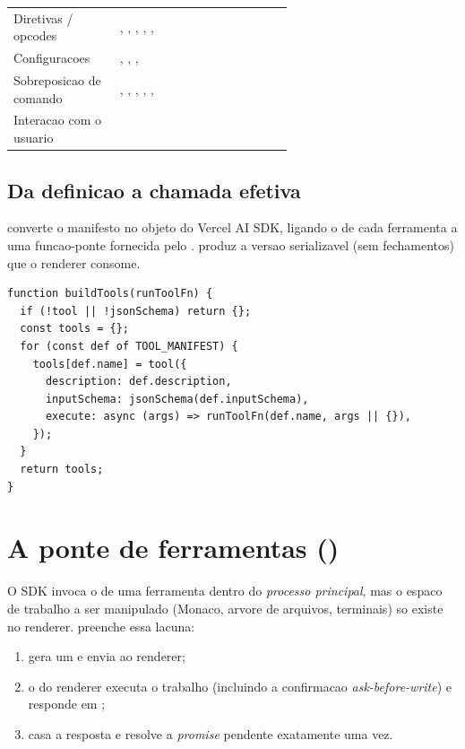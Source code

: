 \begin{longtable}{l P{0.62\linewidth}}
Diretivas / opcodes    & , , , , ,  \\
Configuracoes          & , , ,  \\
Sobreposicao de comando& , , , , ,  \\
Interacao com o usuario&  \\
\end{longtable}

\subsection{Da definicao a chamada efetiva}

 converte o manifesto no objeto  do
Vercel AI SDK, ligando o  de cada ferramenta a uma funcao-ponte
fornecida pelo .  produz a versao serializavel
(sem fechamentos) que o renderer consome.

\begin{lstlisting}[caption={Construcao das ferramentas para o SDK (\texttt{main/ai/tools.js}).}]
function buildTools(runToolFn) {
  if (!tool || !jsonSchema) return {};
  const tools = {};
  for (const def of TOOL_MANIFEST) {
    tools[def.name] = tool({
      description: def.description,
      inputSchema: jsonSchema(def.inputSchema),
      execute: async (args) => runToolFn(def.name, args || {}),
    });
  }
  return tools;
}
\end{lstlisting}

\section{A ponte de ferramentas ()}

O SDK invoca o  de uma ferramenta dentro do \emph{processo
principal}, mas o espaco de trabalho a ser manipulado (Monaco, arvore de
arquivos, terminais) so existe no renderer. 
preenche essa lacuna:

\begin{enumerate}[leftmargin=1.4em]
  \item {} gera um  e envia  ao renderer;
  \item o  do renderer executa o trabalho (incluindo a confirmacao \emph{ask-before-write}) e responde em ;
  \item {} casa a resposta e resolve a \emph{promise} pendente exatamente uma vez.
\end{enumerate}

